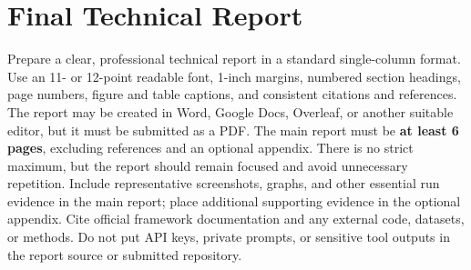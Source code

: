 \documentclass[11pt]{article}
\begin{document}
\section{Final Technical Report}
Prepare a clear, professional technical report in a standard single-column format. Use an 11- or 12-point readable font, 1-inch margins, numbered section headings, page numbers, figure and table captions, and consistent citations and references. The report may be created in Word, Google Docs, Overleaf, or another suitable editor, but it must be submitted as a PDF. The main report must be \textbf{at least 6 pages}, excluding references and an optional appendix. There is no strict maximum, but the report should remain focused and avoid unnecessary repetition. Include representative screenshots, graphs, and other essential run evidence in the main report; place additional supporting evidence in the optional appendix. Cite official framework documentation and any external code, datasets, or methods. Do not put API keys, private prompts, or sensitive tool outputs in the report source or submitted repository.
\end{document}
